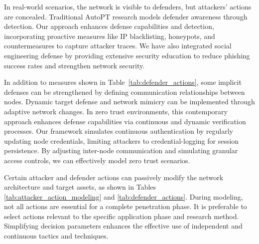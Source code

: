 In real-world scenarios, the network is visible to defenders, but attackers' actions are concealed. Traditional AutoPT research models defender awareness through detection. Our approach enhances defense capabilities and detection, incorporating proactive measures like IP blacklisting, honeypots, and countermeasures to capture attacker traces. We have also integrated social engineering defense by providing extensive security education to reduce phishing success rates and strengthen network security.



In addition to measures shown in Table~\ref{tab:defender_actions}, some implicit defenses can be strengthened by defining communication relationships between nodes. Dynamic target defense and network mimicry can be implemented through adaptive network changes. In zero trust environments, this contemporary approach enhances defense capabilities via continuous and dynamic verification processes. Our framework simulates continuous authentication by regularly updating node credentials, limiting attackers to credential-logging for session persistence. By adjusting inter-node communication and simulating granular access controls, we can effectively model zero trust scenarios.


Certain attacker and defender actions can passively modify the network architecture and target assets, as shown in Tables \ref{tab:attacker_action_modeling} and \ref{tab:defender_actions}. During modeling, not all actions are essential for a complete penetration phase. It is preferable to select actions relevant to the specific application phase and research method. Simplifying decision parameters enhances the effective use of independent and continuous tactics and techniques.

